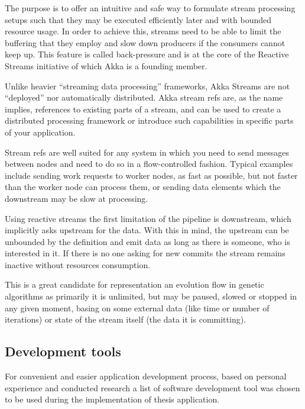 The purpose is to offer an intuitive and safe way to formulate stream processing setups such that they may be executed efficiently later and with bounded resource usage. In order to achieve this, streams need to be able to limit the buffering that they employ and slow down producers if the consumers cannot keep up. This feature is called back-pressure and is at the core of the Reactive Streams initiative of which Akka is a founding member.

Unlike heavier “streaming data processing” frameworks, Akka Streams are not “deployed” nor automatically distributed. Akka stream refs are, as the name implies, references to existing parts of a stream, and can be used to create a distributed processing framework or introduce such capabilities in specific parts of your application.

Stream refs are well suited for any system in which you need to send messages between nodes and need to do so in a flow-controlled fashion. Typical examples include sending work requests to worker nodes, as fast as possible, but not faster than the worker node can process them, or sending data elements which the downstream may be slow at processing. \cite{stream_refs}

Using reactive streams the first limitation of the pipeline is downstream, which implicitly asks upstream for the data. With this in mind, the upstream can be unbounded by the definition and emit data as long as there is someone, who is interested in it. If there is no one asking for new commits the stream remains inactive without resources consumption. 

This is a great candidate for representation an evolution flow in genetic algorithms as primarily it is unlimited, but may be paused, slowed or stopped in any given moment, basing on some external data (like time or number of iterations) or state of the stream itself (the data it is committing).

\subsection{Development tools}
For convenient and easier application development process, based on personal experience and conducted research a list of software development tool was chosen to be used during the implementation of thesis application.

